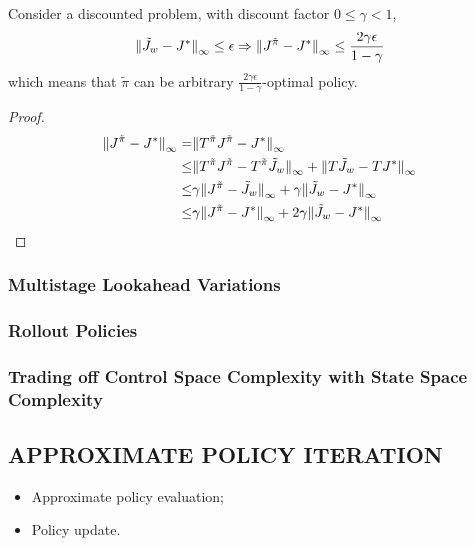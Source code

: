 \begin{theorem}
    Consider a discounted problem, with discount factor $ 0 \le \gamma < 1$,
    \[
        {\Arrowvert \tilde J_{w} - J^* \Arrowvert}_\infty \le \epsilon \Rightarrow
        {\Arrowvert J^{\tilde \pi} - J^* \Arrowvert}_\infty \le \frac{2 \gamma \epsilon}{1 - \gamma} 
    \]
    which means that $ \tilde \pi $ can be arbitrary $ \frac{2\gamma \epsilon}{1 - \gamma} $-optimal policy.
    \begin{proof}
        \begin{align*}
            {\Arrowvert J^{\tilde \pi} - J^* \Arrowvert}_\infty
            =& {\Arrowvert T^{\tilde \pi} J ^{\tilde \pi} - J^{*} \Arrowvert}_\infty\\
            \le& {\Arrowvert T^{\tilde \pi} J^{\tilde \pi} - T^{\tilde \pi} \tilde J_{w} \Arrowvert}_\infty
            + {\Arrowvert T \tilde J_{w} - T J^{*} \Arrowvert}_\infty\\
            \le& \gamma {\Arrowvert J^{\tilde \pi} - \tilde J_{w} \Arrowvert}_\infty + \gamma {\Arrowvert \tilde J_{w} - J^{*} \Arrowvert}_\infty\\
            \le& \gamma {\Arrowvert J^{\tilde \pi} - J^* \Arrowvert}_\infty + 2 \gamma {\Arrowvert \tilde J_{w} - J^* \Arrowvert}_\infty
        \end{align*}
    \end{proof}
\end{theorem}

\subsubsection{Multistage Lookahead Variations}%

\subsubsection{Rollout Policies}%

\subsubsection{Trading off Control Space Complexity with State Space Complexity}%

\subsection{APPROXIMATE POLICY ITERATION}%

\begin{itemize}
    \item Approximate policy evaluation;
    \item Policy update.
\end{itemize}

